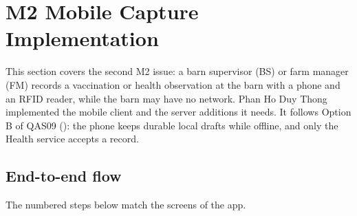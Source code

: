 \section{M2 Mobile Capture Implementation}\label{sec:m2-mobile}

\noindent{}

\medskip
This section covers the second M2 issue: a barn supervisor (BS) or farm
manager (FM) records a vaccination or health observation at the barn
with a phone and an RFID reader, while the barn may have no network.
Phan Ho Duy Thong implemented the mobile client and the server
additions it needs. It follows Option B of QAS09 ():
the phone keeps durable local drafts while offline, and only the Health
service accepts a record.

\subsection{End-to-end flow}\label{sec:m2-mobile-flow}

The numbered steps below match the screens of the app.

